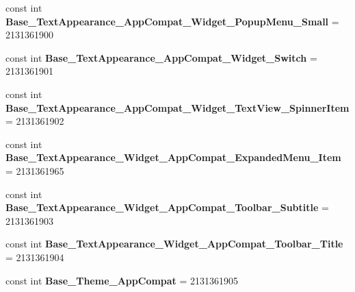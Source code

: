 \begin{DoxyCompactItemize}
\item 
\mbox{\label{class_pinned_app_1_1_droid_1_1_resource_1_1_style_a84a315c07c387741ae3d58f205b90329}} 
const int {\bfseries Base\+\_\+\+Text\+Appearance\+\_\+\+App\+Compat\+\_\+\+Widget\+\_\+\+Popup\+Menu\+\_\+\+Small} = 2131361900
\item 
\mbox{\label{class_pinned_app_1_1_droid_1_1_resource_1_1_style_ac3b6091e417edd7ee858f9cd9e7080cd}} 
const int {\bfseries Base\+\_\+\+Text\+Appearance\+\_\+\+App\+Compat\+\_\+\+Widget\+\_\+\+Switch} = 2131361901
\item 
\mbox{\label{class_pinned_app_1_1_droid_1_1_resource_1_1_style_a09658d905b81e2245127af1a8de9259c}} 
const int {\bfseries Base\+\_\+\+Text\+Appearance\+\_\+\+App\+Compat\+\_\+\+Widget\+\_\+\+Text\+View\+\_\+\+Spinner\+Item} = 2131361902
\item 
\mbox{\label{class_pinned_app_1_1_droid_1_1_resource_1_1_style_a09147224edd4d8290ed9d92fe8a59eb9}} 
const int {\bfseries Base\+\_\+\+Text\+Appearance\+\_\+\+Widget\+\_\+\+App\+Compat\+\_\+\+Expanded\+Menu\+\_\+\+Item} = 2131361965
\item 
\mbox{\label{class_pinned_app_1_1_droid_1_1_resource_1_1_style_ac1e11b9603a48e9ca15b3793b6930f11}} 
const int {\bfseries Base\+\_\+\+Text\+Appearance\+\_\+\+Widget\+\_\+\+App\+Compat\+\_\+\+Toolbar\+\_\+\+Subtitle} = 2131361903
\item 
\mbox{\label{class_pinned_app_1_1_droid_1_1_resource_1_1_style_a2a32b2cd0f806d1e3514e9a91e4c4921}} 
const int {\bfseries Base\+\_\+\+Text\+Appearance\+\_\+\+Widget\+\_\+\+App\+Compat\+\_\+\+Toolbar\+\_\+\+Title} = 2131361904
\item 
\mbox{\label{class_pinned_app_1_1_droid_1_1_resource_1_1_style_a79426043f9564b97a7cbe5ac542b4864}} 
const int {\bfseries Base\+\_\+\+Theme\+\_\+\+App\+Compat} = 2131361905
\item 
\mbox{\label{class_pinned_app_1_1_droid_1_1_resource_1_1_style_a22c42364114f9a3578d61b2edd5b56a3}} 

\end{DoxyCompactItemize}
